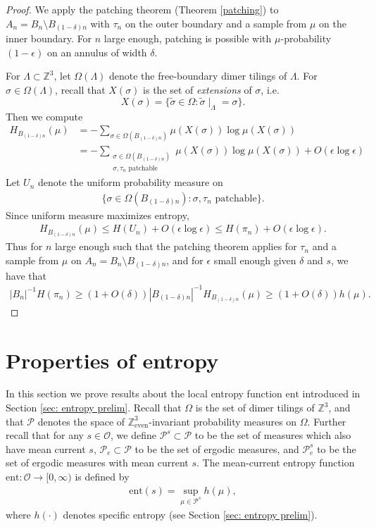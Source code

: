 \documentclass[11pt]{article}
\theoremstyle{remark}
\theoremstyle{definition}
\newcommand{\ent}{\text{ent}}
\newcommand{\mc}[1]{\mathcal{#1}}
\newcommand{\m}[1]{\mathbb{#1}}
\begin{document}
\begin{proof}
We apply the patching theorem (Theorem \ref{patching}) to $A_n = B_n \setminus B_{(1-\delta)n}$ with $\tau_n$ on the outer boundary and a sample from $\mu$ on the inner boundary. For $n$ large enough, patching is possible with $\mu$-probability $(1-\epsilon)$ on an annulus of width $\delta$. 

For $\Lambda\subset \m Z^3$, let $\Omega(\Lambda)$ denote the free-boundary dimer tilings of $\Lambda$. For $\sigma\in \Omega(\Lambda)$, recall that $X(\sigma)$ is the set of \textit{extensions} of $\sigma$, i.e.\
$$X(\sigma) = \{\tilde{\sigma}\in \Omega : \tilde \sigma\mid_{\Lambda} = \sigma\}.$$ 
Then we compute
\begin{align*}
    H_{B_{(1-\delta)n}}(\mu) &= -\sum_{\sigma\in \Omega(B_{(1-\delta)n})} \mu(X(\sigma)) \log \mu(X(\sigma))\\
    &= -\sum_{\substack{\sigma\in \Omega(B_{(1-\delta)n})\\\sigma, \tau_n \text{ patchable}}} \mu(X(\sigma)) \log \mu(X(\sigma)) + O(\epsilon \log \epsilon)
\end{align*}
Let $U_{n}$ denote the uniform probability measure on 
\begin{align*}
    \{\sigma \in \Omega(B_{(1-\delta)n}) : \sigma, \tau_n \text{ patchable}\}. 
\end{align*}
Since uniform measure maximizes entropy, 
\begin{align*}
    H_{B_{(1-\delta)n}}(\mu) \leq H(U_{n}) + O(\epsilon \log \epsilon) \leq H(\pi_n) + O(\epsilon \log \epsilon). 
\end{align*}
Thus for $n$ large enough such that the patching theorem applies for $\tau_n$ and a sample from $\mu$ on $A_n = B_n\setminus B_{(1-\delta)n}$, and for $\epsilon$ small enough given $\delta$ and $s$, we have that
\begin{align*}
    |B_n|^{-1} H(\pi_n) \geq (1+ O(\delta)) |B_{(1-\delta)n}|^{-1} H_{B_{(1-\delta)n}}(\mu) \geq (1+O(\delta)) h(\mu). 
\end{align*}
\end{proof}

\section{Properties of entropy }\label{sec:entropy}

In this section we prove results about the local entropy function $\ent$ introduced in Section \ref{sec: entropy prelim}. Recall that $\Omega$ is the set of dimer tilings of $\m Z^3$, and that $\mc P$ denotes the space of $\m Z^3_{\text{even}}$-invariant probability measures on $\Omega$. Further recall that for any $s\in \mc O$, we define $\mc P^{s}\subset \mc P$ to be the set of measures which also have mean current $s$, $\mc P_e\subset \mc P$ to be the set of ergodic measures, and $\mc P_e^s$ to be the set of ergodic measures with mean current $s$. The mean-current entropy function $\ent:\mc O\to [0,\infty)$ is defined by 
\begin{align*}
    \ent(s) = \sup_{\mu \in \mc P^s} h(\mu),
\end{align*}
where $h(\cdot)$ denotes specific entropy (see Section \ref{sec: entropy prelim}). 
\end{document}
